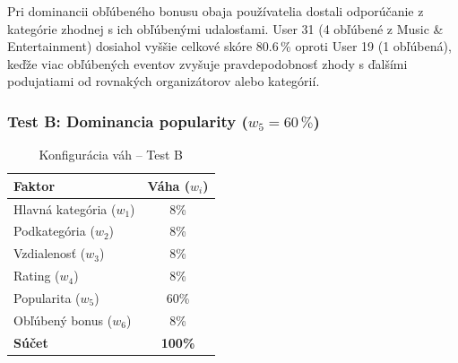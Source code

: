 Pri dominancii obľúbeného bonusu obaja používatelia dostali odporúčanie z kategórie zhodnej s ich obľúbenými udalosťami. User 31 (4 obľúbené z Music \& Entertainment) dosiahol vyššie celkové skóre 80.6\,\% oproti User 19 (1 obľúbená), keďže viac obľúbených eventov zvyšuje pravdepodobnosť zhody s ďalšími podujatiami od rovnakých organizátorov alebo kategórií.

\subsubsection{Test B: Dominancia popularity ($w_5 = 60\,\%$)}

\begin{table}[H]
\centering
\caption{Konfigurácia váh – Test B}
\label{tab:vahy_testB}
\begin{tabular}{|l|c|}
\hline
\textbf{Faktor} & \textbf{Váha ($w_i$)} \\ \hline
Hlavná kategória ($w_1$) & 8\% \\
Podkategória ($w_2$)     & 8\% \\
Vzdialenosť ($w_3$)      & 8\% \\
Rating ($w_4$)           & 8\% \\
Popularita ($w_5$)       & 60\% \\
Obľúbený bonus ($w_6$)   & 8\% \\ \hline
\textbf{Súčet}           & \textbf{100\%} \\ \hline
\end{tabular}
\end{table}

